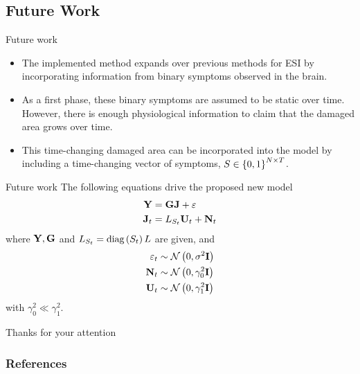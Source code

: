 \documentclass[progressbar=head]{beamer}
\begin{document}
{
\subsection{Future Work}
}

\begin{frame}{Future work}
\begin{itemize}
    \item The implemented method expands over previous methods for ESI by incorporating information from binary symptoms observed in the brain.
    \item As a first phase, these binary symptoms are assumed to be static over time. However, there is enough physiological information to claim that the damaged area grows over time.
    \item This time-changing damaged area can be incorporated into the model by including a time-changing vector of symptoms, ${S\in \left\{ 0,1 \right\}^{N\times T}}$.
\end{itemize}
\end{frame}

\begin{frame}{Future work}
The following equations drive the proposed new model
\begin{align}
    \mathbf{Y} &= \mathbf{G} \mathbf{J} + \varepsilon \\
    \mathbf{J}_t &=  L_{S_t} \mathbf{U}_t + \mathbf{N}_t
\end{align}
where $\mathbf{Y}, \mathbf{G}$ and $L_{S_t} = \text{diag}\left( S_t \right) L$ are given, and
\begin{align}
    \varepsilon_t &\sim  \mathcal{N}\left( 0, \sigma^2 \mathbf{I}  \right) \\
    \mathbf{N}_t &\sim  
    \mathcal{N}\left( 0, \gamma_0^2 \mathbf{I}  \right) \\
    \mathbf{U}_t &\sim  
    \mathcal{N}\left( 0, \gamma_1^2 \mathbf{I}  \right) 
\end{align}
with $\gamma_0^2 \ll \gamma_1^2$.
\end{frame}

\begin{frame}{Thanks for your attention}

\end{frame}



\begin{frame}[allowframebreaks]
  \frametitle{References}
  \printbibliography
\end{frame}
\end{document}
